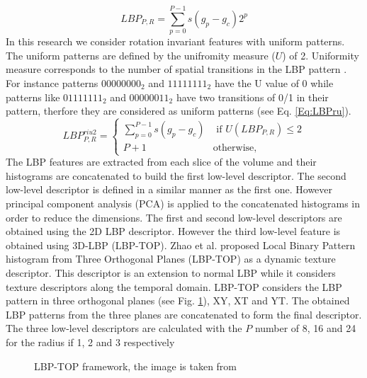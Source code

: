 	\begin{equation} \label{Eq:LBP}
 		LBP_{P,R} = \sum_{p=0}^{P-1}s(g_{p} - g_{c})2^{p}
	\end{equation}
In this research we consider rotation invariant features with uniform patterns. The uniform patterns are defined by the unifromity measure ($U$) of 2. Uniformity measure corresponds to the number of spatial transitions in the LBP pattern \cite{ojala2002multiresolution}. For instance patterns $00000000_{2}$ and $11111111_{2}$ have the U value of 0 while patterns like $01111111_{2}$ and $00000011_{2}$ have two transitions of 0/1 in their pattern, therfore they are considered as uniform patterns (see Eq. \ref{Eq:LBPru}). 
	\begin{equation}\label{Eq:LBPru}
		LBP_{P,R}^{riu2} = 
  			\begin{cases}
    				 \sum_{p=0}^{P-1}s(g_{p} - g_{c}) & \text{ if } U(LBP_{P,R}) \le 2\\
    				  P+1 & \text{otherwise,}
  			\end{cases}
    \end{equation}
The LBP features are extracted from each slice of the volume and their histograms are concatenated to build the first low-level descriptor. The second low-level descriptor is defined in a similar manner as the first one. However principal component analysis (PCA) is applied to the concatenated histograms in order to reduce the dimensions. The first and second low-level descriptors are obtained using the 2D LBP descriptor. However the third low-level feature is obtained using 3D-LBP (LBP-TOP). Zhao et al. \cite{zhao2007dynamic} proposed Local Binary Pattern histogram from Three Orthogonal Planes (LBP-TOP) as a dynamic texture descriptor. This descriptor is an extension to normal LBP while it considers texture descriptors along the temporal domain. LBP-TOP considers the LBP pattern in three orthogonal planes (see Fig. \ref{fig:LBPTOP-framework}), XY, XT and YT. The obtained LBP patterns from the three planes are concatenated to form the final descriptor. The three low-level descriptors are calculated with the $P$ number of 8, 16 and 24 for the radius if 1, 2 and 3 respectively

\begin{figure}
	\caption{LBP-TOP framework, the image is taken from \cite{JiangEtAl13}}
	\label{fig:LBPTOP-framework}
\end{figure}

